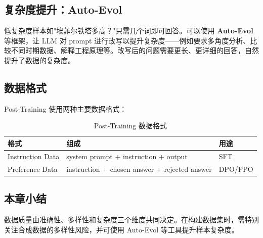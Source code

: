 \subsection{复杂度提升：Auto-Evol}

低复杂度样本如"埃菲尔铁塔多高？"只需几个词即可回答。可以使用 \textbf{Auto-Evol} 等框架，让 LLM 对 prompt 进行改写以提升复杂度——例如要求多角度分析、比较不同时期数据、解释工程原理等。改写后的问题需要更长、更详细的回答，自然提升了数据的复杂度。

\subsection{数据格式}

Post-Training 使用两种主要数据格式：

\begin{table}[H]
\centering
\caption{Post-Training 数据格式}
\begin{tabular}{lll}
\toprule
\textbf{格式} & \textbf{组成} & \textbf{用途} \\
\midrule
Instruction Data & system prompt + instruction + output & SFT \\
Preference Data & instruction + chosen answer + rejected answer & DPO/PPO \\
\bottomrule
\end{tabular}
\end{table}

\subsection{本章小结}

数据质量由准确性、多样性和复杂度三个维度共同决定。在构建数据集时，需特别关注合成数据的多样性风险，并可使用 Auto-Evol 等工具提升样本复杂度。

\newpage
